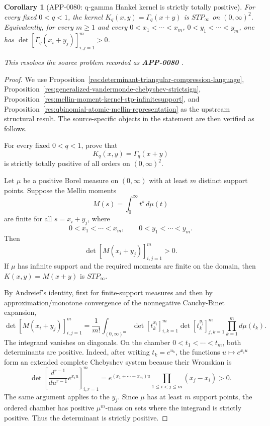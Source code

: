 \documentclass[11pt]{article}
\numberwithin{equation}{section}
\newtheorem{corollary}[theorem]{Corollary}
\theoremstyle{definition}
\theoremstyle{remark}
\newcommand{\1}{\mathbf 1}
\begin{document}
\begin{corollary}[APP-0080: q-gamma Hankel kernel is strictly totally positive]
\label{res:qgamma-hankelkernel-stpinfinity}
For every fixed \(0<q<1\), the kernel \(K_q(x,y)=\Gamma_q(x+y)\) is \(STP_\infty\) on \((0,\infty)^2\). Equivalently, for every \(m\ge1\) and every \(0<x_1<\cdots<x_m\), \(0<y_1<\cdots<y_m\), one has \(\det[\Gamma_q(x_i+y_j)]_{i,j=1}^m>0\).



This resolves the source problem recorded as \textbf{APP-0080} \cite{app-app-0080-source}.
\end{corollary}

\begin{proof}
We use Proposition~\ref{res:determinant-triangular-compression-language}, Proposition~\ref{res:generalized-vandermonde-chebyshev-strictsign}, Proposition~\ref{res:mellin-moment-kernel-stp-infinitesupport}, and Proposition~\ref{res:qbinomial-atomic-mellin-representation} as the upstream structural result. The source-specific objects in the statement are then verified as follows.

For every fixed \(0<q<1\), prove that
\[
K_q(x,y)=\Gamma_q(x+y)
\]
is strictly totally positive of all orders on \((0,\infty)^2\).

Let \(\mu\) be a positive Borel measure on \((0,\infty)\) with at least \(m\) distinct support points. Suppose the Mellin moments
\[
M(s)=\int_0^\infty t^s\,d\mu(t)
\]
are finite for all \(s=x_i+y_j\), where
\[
0<x_1<\cdots<x_m,\qquad 0<y_1<\cdots<y_m.
\]
Then
\[
\det[M(x_i+y_j)]_{i,j=1}^m>0.
\]
If \(\mu\) has infinite support and the required moments are finite on the domain, then \(K(x,y)=M(x+y)\) is \(STP_\infty\).

By Andreief's identity, first for finite-support measures and then by approximation/monotone convergence of the nonnegative Cauchy-Binet expansion,
\[
\det[M(x_i+y_j)]_{i,j=1}^m
=\frac{1}{m!}\int_{(0,\infty)^m}
\det[t_k^{x_i}]_{i,k=1}^m
\det[t_k^{y_j}]_{j,k=1}^m
\prod_{k=1}^m d\mu(t_k).
\]
The integrand vanishes on diagonals. On the chamber \(0<t_1<\cdots<t_m\), both determinants are positive. Indeed, after writing \(t_k=e^{u_k}\), the functions \(u\mapsto e^{x_i u}\) form an extended complete Chebyshev system because their Wronskian is
\[
\det\left[\frac{d^{r-1}}{du^{r-1}}e^{x_i u}\right]_{i,r=1}^m
=e^{(x_1+\cdots+x_m)u}\prod_{1\le i<j\le m}(x_j-x_i)>0.
\]
The same argument applies to the \(y_j\). Since \(\mu\) has at least \(m\) support points, the ordered chamber has positive \(\mu^m\)-mass on sets where the integrand is strictly positive. Thus the determinant is strictly positive.


\end{proof}
\end{document}
